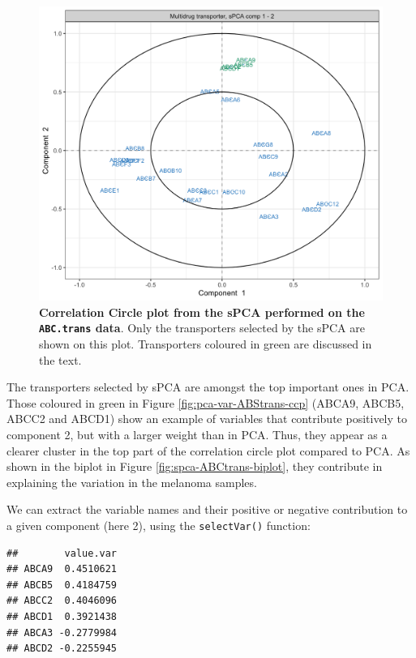 \documentclass[]{book}
\newenvironment{Shaded}{\begin{snugshade}}{\end{snugshade}}
\newcommand{\KeywordTok}[1]{\textcolor[rgb]{0.13,0.29,0.53}{\textbf{#1}}}
\newcommand{\DataTypeTok}[1]{\textcolor[rgb]{0.13,0.29,0.53}{#1}}
\newcommand{\DecValTok}[1]{\textcolor[rgb]{0.00,0.00,0.81}{#1}}
\newcommand{\CommentTok}[1]{\textcolor[rgb]{0.56,0.35,0.01}{\textit{#1}}}
\newcommand{\OperatorTok}[1]{\textcolor[rgb]{0.81,0.36,0.00}{\textbf{#1}}}
\newcommand{\NormalTok}[1]{#1}
\begin{document}
\begin{figure}

{\centering \includegraphics[width=0.5\linewidth]{Figures/PCA/spca-var-ABStrans-ccp-1} 

}

\caption{\textbf{Correlation Circle plot from the
sPCA performed on the \texttt{ABC.trans} data}. Only the transporters
selected by the sPCA are shown on this plot. Transporters coloured in
green are discussed in the text.}\label{fig:spca-var-ABStrans-ccp}
\end{figure}






The transporters selected by sPCA are amongst the top important ones in
PCA. Those coloured in green in Figure \ref{fig:pca-var-ABStrans-ccp}
(ABCA9, ABCB5, ABCC2 and ABCD1) show an example of variables that
contribute positively to component 2, but with a larger weight than in
PCA. Thus, they appear as a clearer cluster in the top part of the
correlation circle plot compared to PCA. As shown in the biplot in
Figure \ref{fig:spca-ABCtrans-biplot}, they contribute in explaining the
variation in the melanoma samples.

We can extract the variable names and their positive or negative
contribution to a given component (here 2), using the
\texttt{selectVar()} function:

\begin{Shaded}
\end{Shaded}

\begin{verbatim}
##        value.var
## ABCA9  0.4510621
## ABCB5  0.4184759
## ABCC2  0.4046096
## ABCD1  0.3921438
## ABCA3 -0.2779984
## ABCD2 -0.2255945
\end{verbatim}
\end{document}
